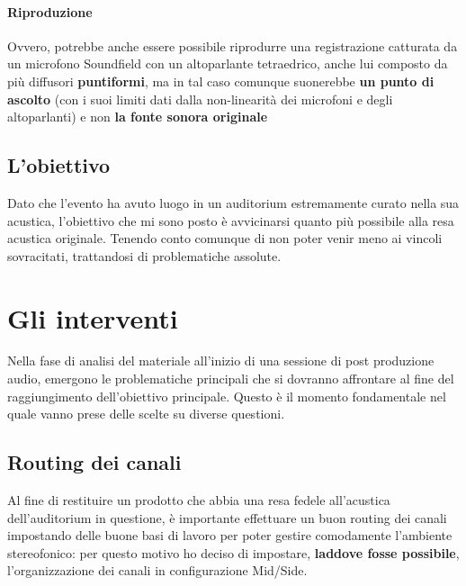 	\paragraph{Riproduzione} Ovvero, potrebbe anche essere possibile riprodurre una registrazione catturata da un microfono Soundfield con un altoparlante tetraedrico, anche lui composto da più diffusori \textbf{puntiformi}, ma in tal caso comunque suonerebbe \textbf{un punto di ascolto} (con i suoi limiti dati dalla non-linearità dei microfoni e degli altoparlanti) e non \textbf{la fonte sonora originale}
	
	
	\subsection{L'obiettivo}
	Dato che l'evento ha avuto luogo in un auditorium estremamente curato nella sua acustica, l'obiettivo che mi sono posto è avvicinarsi quanto più possibile alla resa acustica originale. Tenendo conto comunque di non poter venir meno ai vincoli sovracitati, trattandosi di problematiche assolute.
	
\section{Gli interventi}
Nella fase di analisi del materiale all'inizio di una sessione di post produzione audio, emergono le problematiche principali che si dovranno affrontare al fine del raggiungimento dell'obiettivo principale. Questo è il momento fondamentale nel quale vanno prese delle scelte su diverse questioni.

	\subsection{Routing dei canali}
	Al fine di restituire un prodotto che abbia una resa fedele all'acustica dell'auditorium in questione, è importante effettuare un buon routing dei canali impostando delle buone basi di lavoro per poter gestire comodamente l'ambiente stereofonico: per questo motivo ho deciso di impostare, \textbf{laddove fosse possibile}, l'organizzazione dei canali in configurazione Mid/Side.
	

